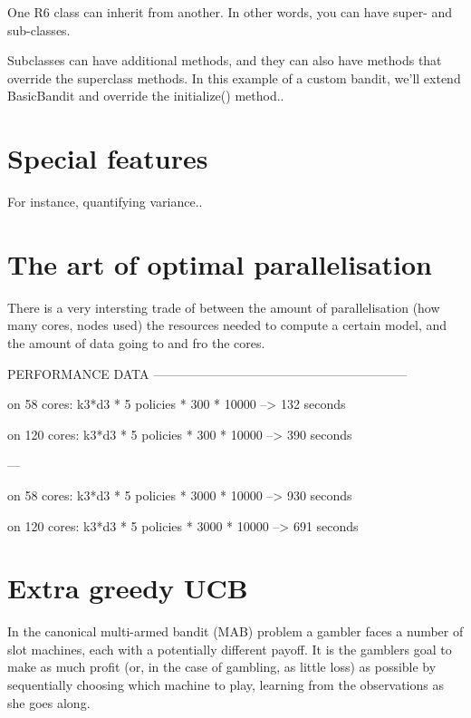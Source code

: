 \documentclass[nojss]{jss}\usepackage[]{graphicx}\usepackage[]{color}
\begin{document}
One R6 class can inherit from another. In other words, you can have super- and sub-classes.

Subclasses can have additional methods, and they can also have methods that override the superclass methods. In this example of a custom  bandit, we’ll extend BasicBandit and override the initialize() method..

\section{Special features}

For instance, quantifying variance..

\section{The art of optimal parallelisation}

There is a very intersting trade of between the amount of parallelisation (how many cores, nodes used) the resources needed to compute a certain model, and the amount of data going to and fro the cores.

PERFORMANCE DATA  ------------------------------------------------------------

on 58  cores:    k3*d3 * 5 policies * 300  * 10000 --\textgreater{} 132 seconds

on 120 cores:    k3*d3 * 5 policies * 300  * 10000 --\textgreater{} 390 seconds

---

on 58  cores:    k3*d3 * 5 policies * 3000 * 10000 --\textgreater{} 930 seconds

on 120 cores:    k3*d3 * 5 policies * 3000 * 10000 --\textgreater{} 691 seconds



\section{Extra greedy UCB}

In the canonical multi-armed bandit (MAB) problem a gambler faces a number of slot machines, each with a potentially different payoff. It is the gamblers goal to make as much profit (or, in the case of gambling, as little loss) as possible by sequentially choosing which machine to play, learning from the observations as she goes along.
\end{document}
